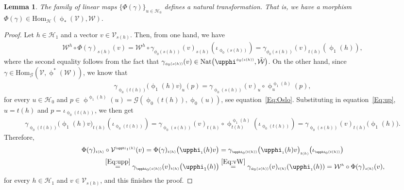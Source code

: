 \documentclass[10pt,a4paper]{amsart}
\numberwithin{equation}{section}
\newtheorem{Lemma}[Theorem]{Lemma}
\renewcommand{\hom}[3]{\mathrm{Hom}_{\Sscript{#1}}\left(#2, #3\right)}
\newcommand{\Ho}{\cH_{\Sscript{0}}}
\newcommand{\Ha}{\cH_{\Sscript{1}}}
\newcommand{\cG}{{\mathcal G}}
\newcommand{\cH}{{\mathcal H}}
\newcommand{\cV}{{\mathcal V}}
\newcommand{\cW}{{\mathcal W}}
\newcommand{\Sscript}[1]{\scriptscriptstyle{#1}}
\newcommand{\phia}{\upphi_{\Sscript{1}}}
\begin{document}
\begin{Lemma}\label{lema:Phi}The family of linear maps $\{ \Phi(\gamma)\}_{\Sscript{u \in \Ho}}$ defines a natural transformation. That is, we have a morphism $\Phi(\gamma) \in \hom{\cH}{\upphi_{*}(\cV)}{\cW}$.
\end{Lemma}
\begin{proof}Let $h \in \Ha$ and a vector $v \in \cV_{\Sscript{s(h)}}$. Then, from one hand, we have
\begin{gather}\label{Eq:vW}
\cW^{\Sscript{h}} \circ \Phi(\gamma)_{\Sscript{s(h)}}(v) = \cW^{\Sscript{h}} \circ \gamma_{\Sscript{\phi_0(s(h))}}(v)_{\Sscript{s(h)}}(\iota_{\Sscript{\upphi_{0}(s(h))}}) =\gamma_{\Sscript{\phi_0(s(h))}}(v)_{
\Sscript{t(h)}}(\upphi_{\Sscript{1}}(h)),
\end{gather}
where the second equality follows from the fact that $\gamma_{\Sscript{\phi_0(s(h))}}(v) \in {\rm Nat}\big(\upphi^{\Sscript{\phi_0(s(h))}}, \tilde{\cW}\big)$. On the other hand, since $\gamma \in \hom{\cG}{\cV}{\upphi^*(\cW)}$, we know that
\begin{gather}\label{Eq:up}
\gamma_{\Sscript{\upphi_0(t(h))}}\big( \upphi_{\Sscript{1}}(h) v \big)_{\Sscript{u}} (p) = \gamma_{\Sscript{\upphi_0(s(h))}}( v)_{\Sscript{u}} \circ \upphi^{\Sscript{\upphi_1(h)}}_{\Sscript{u}}(p),
\end{gather}
for every $u \in \Ho$ and $p \in \upphi^{\Sscript{\upphi_1(h)}} (u)=\cG( \upphi_{\Sscript{0}}(t(h)),\upphi_{\Sscript{0}}(u) )$, see equation~\eqref{Eq:Oslo}. Substituting in equation~\eqref{Eq:up}, $u= t(h)$ and $p = \iota_{\Sscript{\upphi_0(t(h))}}$, we then get
\begin{gather}\label{Eq:upp}
\gamma_{\Sscript{\upphi_0(t(h))}}\big( \upphi_{\Sscript{1}}(h) v
\big)_{\Sscript{t(h)}} (\iota_{\Sscript{\upphi_0(t(h))}}) =
\gamma_{\Sscript{\upphi_0(s(h))}}(v)_{\Sscript{t(h)}}
\circ \upphi^{\Sscript{\upphi_1(h)}}_{\Sscript{t(h)}}(\iota_{\Sscript{\upphi_0(t(h))}})
= \gamma_{\Sscript{\upphi_0(s(h))}}(v)_{\Sscript{t(h)}}
\big( \upphi_1(h) \big).
\end{gather}
Therefore,
\begin{gather*}
\Phi(\gamma)_{\Sscript{t(h)}}\circ \cV^{\Sscript{\phia(h)}} (v) = \Phi(\gamma)_{\Sscript{t(h)}}\big( \phia(h) v \big) = \gamma_{\Sscript{\upphi_0(t(h))}}\big( \phia(h) v\big)_{\Sscript{t(h)}}\big(\iota_{\Sscript{\upphi_0(t(h))}} \big)\\
\hphantom{\Phi(\gamma)_{\Sscript{t(h)}}\circ \cV^{\Sscript{\phia(h)}} (v)}{}\overset{\eqref{Eq:upp}}{=} \gamma_{\Sscript{\upphi_0(s(h))}}(v)_{\Sscript{t(h)}}
\big( \upphi_1(h) \big) \overset{\eqref{Eq:vW}}{=} \gamma_{\Sscript{\phi_0(s(h))}}(v)_{ \Sscript{t(h)}}(\upphi_{\Sscript{1}}(h)) = \cW^{\Sscript{h}} \circ \Phi(\gamma)_{\Sscript{s(h)}}(v),
\end{gather*}
for every $h \in \Ha$ and $v \in \cV_{\Sscript{s(h)}}$, and this finishes the proof.
\end{proof}
\end{document}
